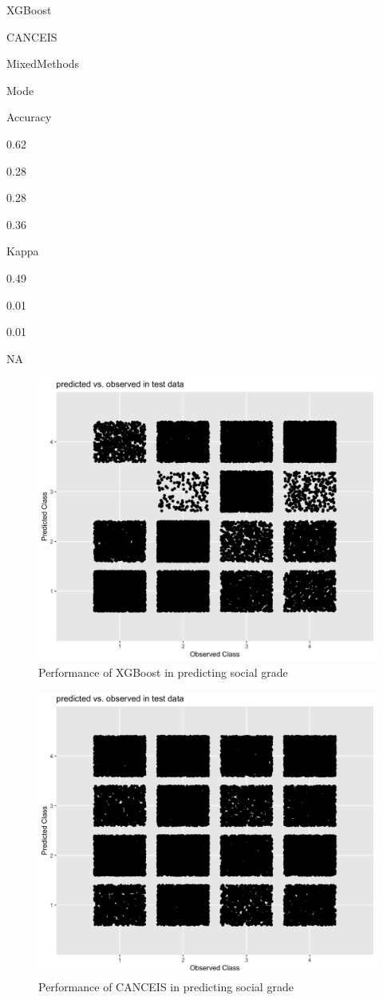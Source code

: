 \documentclass[]{book}
\begin{document}
XGBoost

CANCEIS

MixedMethods

Mode

Accuracy

0.62

0.28

0.28

0.36

Kappa

0.49

0.01

0.01

NA

\begin{figure}
\centering
\includegraphics{images/SGXGBoostqplot.png}
\caption{Performance of XGBoost in predicting social grade}
\end{figure}

\begin{figure}
\centering
\includegraphics{images/SGCANCEISqplot.png}
\caption{Performance of CANCEIS in predicting social grade}
\end{figure}
\end{document}
